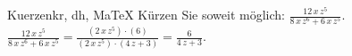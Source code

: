 \begin{MAufgabe}{Kuerzen}{kr, dh, MaTeX}
K\"urzen Sie soweit m\"oglich: $\frac{12\, x\, z^5}{8\, x\, z^6 + 6\, x\, z^5}$.\\ 
\ifLsg\MLoesung
\quad $\frac{12\, x\, z^5}{8\, x\, z^6 + 6\, x\, z^5}=\frac{(2\, x\, z^5)\cdot(6)}{(2\, x\, z^5)\cdot(4\, z + 3)}=\frac{6}{4\, z + 3}$.\else\relax\fi
 \end{MAufgabe}